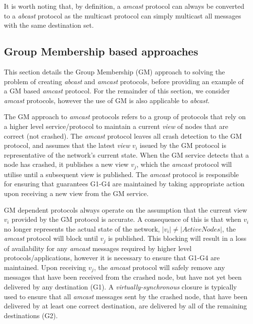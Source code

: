        It is worth noting that, by definition, a \emph{amcast} protocol can always be converted to a \emph{abcast} protocol as the multicast protocol can simply multicast all messages with the same destination set.  
       
	\subsection{Group Membership based approaches}
    This section details the Group Membership (GM) approach to solving the problem of creating \emph{abcast} and \emph{amcast} protocols, before providing an example of a GM based \emph{amcast} protocol.  For the remainder of this section, we consider \emph{amcast} protocols, however the use of GM is also applicable to \emph{abcast}.  
	
	The GM approach to \emph{amcast} protocols refers to a group of protocols that rely on a higher level service/protocol to maintain a current \emph{view} of nodes that are correct (not crashed).  The \emph{amcast} protocol leaves all crash detection to the GM protocol, and assumes that the latest \emph{view} $v_i$ issued by the GM protocol is representative of the network's current state.  When the GM service detects that a node has crashed, it publishes a new view $v_j$, which the \emph{amcast} protocol will utilise until a subsequent view is published.  The \emph{amcast} protocol is responsible for ensuring that guarantees G1-G4 are maintained by taking appropriate action upon receiving a new view from the GM service.  
	
	GM dependent protocols always operate on the assumption that the current view $v_i$ provided by the GM protocol is accurate.  A consequence of this is that when $v_i$ no longer represents the actual state of the network, $\left\vert v_i \right\vert \neq \left\vert ActiveNodes \right\vert$, the \emph{amcast} protocol will block until $v_j$ is published.  This blocking will result in a loss of availability for any \emph{amcast} messages required by higher level protocols/applications, however it is necessary to ensure that G1-G4 are maintained.  Upon receiving $v_j$, the \emph{amcast} protocol will safely remove any messages that have been received from the crashed node, but have not yet been delivered by any destination (G1).  A \emph{virtually-synchronous}\cite{Birman:1991:LCA:128738.128742} closure is typically used to ensure that all \emph{amcast} messages sent by the crashed node, that have been delivered by at least one correct destination, are delivered by all of the remaining destinations (G2).  

